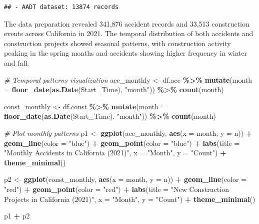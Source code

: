 \documentclass[
]{article}
\newenvironment{Shaded}{\begin{snugshade}}{\end{snugshade}}
\newcommand{\AttributeTok}[1]{\textcolor[rgb]{0.13,0.29,0.53}{#1}}
\newcommand{\CommentTok}[1]{\textcolor[rgb]{0.56,0.35,0.01}{\textit{#1}}}
\newcommand{\FunctionTok}[1]{\textcolor[rgb]{0.13,0.29,0.53}{\textbf{#1}}}
\newcommand{\NormalTok}[1]{#1}
\newcommand{\OtherTok}[1]{\textcolor[rgb]{0.56,0.35,0.01}{#1}}
\newcommand{\SpecialCharTok}[1]{\textcolor[rgb]{0.81,0.36,0.00}{\textbf{#1}}}
\newcommand{\StringTok}[1]{\textcolor[rgb]{0.31,0.60,0.02}{#1}}
\begin{document}
\begin{verbatim}
## - AADT dataset: 13874 records
\end{verbatim}

The data preparation revealed 341,876 accident records and 33,513
construction events across California in 2021. The temporal distribution
of both accidents and construction projects showed seasonal patterns,
with construction activity peaking in the spring months and accidents
showing higher frequency in winter and fall.

\begin{Shaded}
\begin{Highlighting}[]
\CommentTok{\# Temporal patterns visualization}
\NormalTok{acc\_monthly }\OtherTok{\textless{}{-}}\NormalTok{ df.acc }\SpecialCharTok{\%\textgreater{}\%}
  \FunctionTok{mutate}\NormalTok{(}\AttributeTok{month =} \FunctionTok{floor\_date}\NormalTok{(}\FunctionTok{as.Date}\NormalTok{(Start\_Time), }\StringTok{"month"}\NormalTok{)) }\SpecialCharTok{\%\textgreater{}\%}
  \FunctionTok{count}\NormalTok{(month)}

\NormalTok{const\_monthly }\OtherTok{\textless{}{-}}\NormalTok{ df.const }\SpecialCharTok{\%\textgreater{}\%}
  \FunctionTok{mutate}\NormalTok{(}\AttributeTok{month =} \FunctionTok{floor\_date}\NormalTok{(}\FunctionTok{as.Date}\NormalTok{(Start\_Time), }\StringTok{"month"}\NormalTok{)) }\SpecialCharTok{\%\textgreater{}\%}
  \FunctionTok{count}\NormalTok{(month)}

\CommentTok{\# Plot monthly patterns}
\NormalTok{p1 }\OtherTok{\textless{}{-}} \FunctionTok{ggplot}\NormalTok{(acc\_monthly, }\FunctionTok{aes}\NormalTok{(}\AttributeTok{x =}\NormalTok{ month, }\AttributeTok{y =}\NormalTok{ n)) }\SpecialCharTok{+}
  \FunctionTok{geom\_line}\NormalTok{(}\AttributeTok{color =} \StringTok{"blue"}\NormalTok{) }\SpecialCharTok{+}
  \FunctionTok{geom\_point}\NormalTok{(}\AttributeTok{color =} \StringTok{"blue"}\NormalTok{) }\SpecialCharTok{+}
  \FunctionTok{labs}\NormalTok{(}\AttributeTok{title =} \StringTok{"Monthly Accidents in California (2021)"}\NormalTok{,}
       \AttributeTok{x =} \StringTok{"Month"}\NormalTok{, }\AttributeTok{y =} \StringTok{"Count"}\NormalTok{) }\SpecialCharTok{+}
  \FunctionTok{theme\_minimal}\NormalTok{()}

\NormalTok{p2 }\OtherTok{\textless{}{-}} \FunctionTok{ggplot}\NormalTok{(const\_monthly, }\FunctionTok{aes}\NormalTok{(}\AttributeTok{x =}\NormalTok{ month, }\AttributeTok{y =}\NormalTok{ n)) }\SpecialCharTok{+}
  \FunctionTok{geom\_line}\NormalTok{(}\AttributeTok{color =} \StringTok{"red"}\NormalTok{) }\SpecialCharTok{+}
  \FunctionTok{geom\_point}\NormalTok{(}\AttributeTok{color =} \StringTok{"red"}\NormalTok{) }\SpecialCharTok{+}
  \FunctionTok{labs}\NormalTok{(}\AttributeTok{title =} \StringTok{"New Construction Projects in California (2021)"}\NormalTok{,}
       \AttributeTok{x =} \StringTok{"Month"}\NormalTok{, }\AttributeTok{y =} \StringTok{"Count"}\NormalTok{) }\SpecialCharTok{+}
  \FunctionTok{theme\_minimal}\NormalTok{()}

\NormalTok{p1 }\SpecialCharTok{+}\NormalTok{ p2}
\end{Highlighting}
\end{Shaded}
\end{document}
